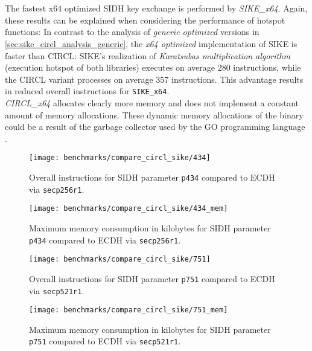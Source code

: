 \\\\
The fastest x64 optimized \gls{SIDH} key exchange is performed by \textit{SIKE\_x64}. Again, these results can be explained when considering the performance of hotspot functions: In contrast to the analysis of \textit{generic optimized} versions in \autoref{sec:sike_circl_analysis_generic}, the \textit{x64 optimized} implementation of \gls{SIKE} is faster than \gls{CIRCL}: \gls{SIKE}'s realization of \textit{Karatsubas multiplication algorithm} (execution hotspot of both libraries) executes on average $280$ instructions, while the \gls{CIRCL} variant processes on average $357$ instructions. This advantage results in reduced overall instructions for \texttt{SIKE\_x64}.\\
\textit{CIRCL\_x64} allocates clearly more memory and does not implement a constant amount of memory allocations. These dynamic memory allocations of the binary could be a result of the garbage collector used by the GO programming language \parencite{Hudson:GGC}.

\begin{figure}[H]
  \centering
  \texttt{[image: benchmarks/compare\_circl\_sike/434]}
  \caption[Instructions of SIKE and CIRCL (\texttt{p434})]
  {Overall instructions for \gls{SIDH} parameter \texttt{p434} compared to \gls{ECDH} via \texttt{secp256r1}.}
  \label{fig:results_opt_434}
\end{figure}

\begin{figure}[H]
  \centering
  \texttt{[image: benchmarks/compare\_circl\_sike/434\_mem]}
  \caption[Memory consumption of SIKE and CIRCL (\texttt{p434})]
  {Maximum memory consumption in kilobytes for \gls{SIDH} parameter \texttt{p434} compared to \gls{ECDH} via \texttt{secp256r1}.}
  \label{fig:results_opt_434_mem}
\end{figure}

\begin{figure}[H]
  \centering
  \texttt{[image: benchmarks/compare\_circl\_sike/751]}
  \caption[Instructions of SIKE and CIRCL (\texttt{p751})]
  {Overall instructions for \gls{SIDH} parameter \texttt{p751} compared to \gls{ECDH} via \texttt{secp521r1}.}
  \label{fig:results_opt_751}
\end{figure}

\begin{figure}[H]
  \centering
  \texttt{[image: benchmarks/compare\_circl\_sike/751\_mem]}
  \caption[Memory consumption of SIKE and CIRCL (\texttt{p751})]
  {Maximum memory consumption in kilobytes for \gls{SIDH} parameter \texttt{p751} compared to \gls{ECDH} via \texttt{secp521r1}.}
  \label{fig:results_opt_751_mem}
\end{figure}

